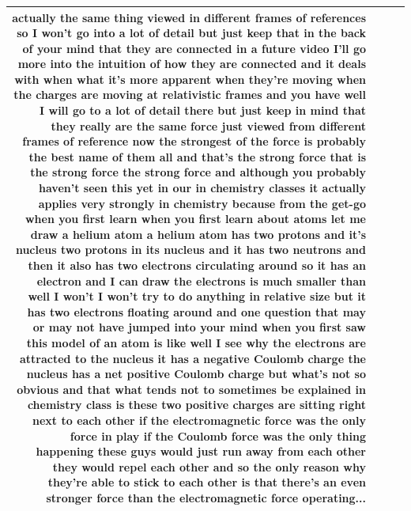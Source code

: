 \documentclass[10pt]{article}
\begin{document}
\begin{tiny}
\begin{longtable}{|r|p{0.375in}|p{1.275in}|p{3.5in}|}
actually the same thing viewed in different frames of references so I won't go into a lot of detail but just keep that in the back of your mind that they are connected in a future video I'll go more into the intuition of how they are connected and it deals with when what it's more apparent when they're moving when the charges are moving at relativistic frames and you have well I will go to a lot of detail there but just keep in mind that they really are the same force just viewed from different frames of reference now the strongest of the force is probably the best name of them all and that's the strong force that is the strong force the strong force and although you probably haven't seen this yet in our in chemistry classes it actually applies very strongly in chemistry because from the get-go when you first learn when you first learn about atoms let me draw a helium atom a helium atom has two protons and it's nucleus two protons in its nucleus and it has two neutrons and then it also has two electrons circulating around so it has an electron and I can draw the electrons is much smaller than well I won't I won't try to do anything in relative size but it has two electrons floating around and one question that may or may not have jumped into your mind when you first saw this model of an atom is like well I see why the electrons are attracted to the nucleus it has a negative Coulomb charge the nucleus has a net positive Coulomb charge but what's not so obvious and that what tends not to sometimes be explained in chemistry class is these two positive charges are sitting right next to each other if the electromagnetic force was the only force in play if the Coulomb force was the only thing happening these guys would just run away from each other they would repel each other and so the only reason why they're able to stick to each other is that there's an even stronger force than the electromagnetic force operating... \\\hline

\end{longtable}
\end{tiny}
\end{document}
